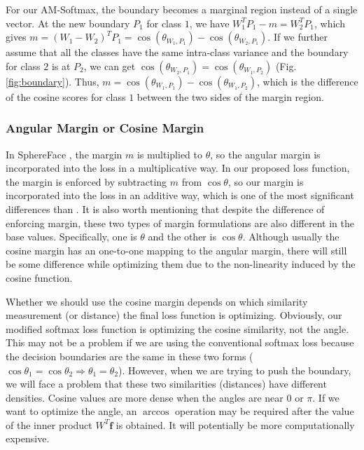 \documentclass[10pt,twocolumn,letterpaper]{article}
\begin{document}
For our AM-Softmax, the boundary becomes a marginal region instead of a single vector. At the new boundary $P_1$ for class $1$, we have $W_1^T P_1 - m = W_2^T P_1$, which gives $m = (W_1 - W_2)^T P_1 = \cos(\theta_{W_1,P_1})-\cos(\theta_{W_2,P_1})$. If we further assume that all the classes have the same intra-class variance and the boundary for class $2$ is at $P_2$, we can get $\cos(\theta_{W_2,P_1})=\cos(\theta_{W_1,P_2})$ (Fig. \ref{fig:boundary}). Thus, $m = \cos(\theta_{W_1,P_1})-\cos(\theta_{W_1,P_2})$, which is the difference of the cosine scores for class $1$ between the two sides of the margin region.



\subsubsection{Angular Margin or Cosine Margin}

In SphereFace \cite{liu2017sphereface}, the margin $m$ is multiplied to $\theta$, so the angular margin is incorporated into the loss in a multiplicative way. In our proposed loss function, the margin is enforced by subtracting $m$ from $\cos\theta$, so our margin is incorporated into the loss in an additive way, which is one of the most significant differences than \cite{liu2017sphereface}. It is also worth mentioning that despite the difference of enforcing margin, these two types of margin formulations are also different in the base values. Specifically, one is $\theta$ and the other is $\cos\theta$. Although usually the cosine margin has an one-to-one mapping to the angular margin, there will still be some difference while optimizing them due to the non-linearity induced by the cosine function.

Whether we should use the cosine margin depends on which similarity measurement (or distance) the final loss function is optimizing. Obviously, our modified softmax loss function is optimizing the cosine similarity, not the angle. This may not be a problem if we are using the conventional softmax loss because the decision boundaries are the same in these two forms ($\cos\theta_1 = \cos\theta_2 \Rightarrow \theta_1=\theta_2$). However, when we are trying to push the boundary, we will face a problem that these two similarities (distances) have different densities. Cosine values are more dense when the angles are near $0$ or $\pi$. If we want to optimize the angle, an $\arccos$ operation may be required after the value of the inner product $W^T \bm{f}$ is obtained. It will potentially be more computationally expensive.
\end{document}
